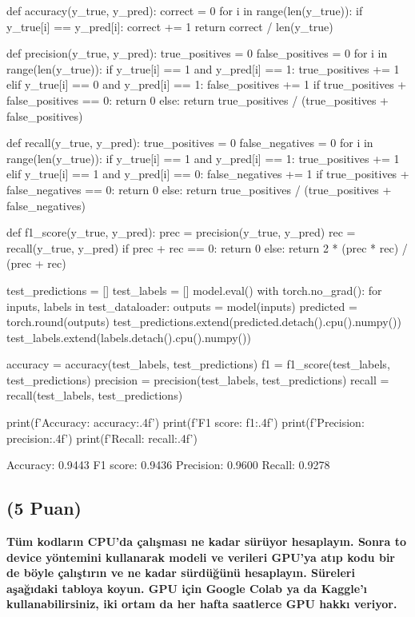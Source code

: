 \documentclass[11pt]{article}
\begin{document}
\begin{python}
def accuracy(y_true, y_pred):
    correct = 0
    for i in range(len(y_true)):
        if y_true[i] == y_pred[i]:
            correct += 1
    return correct / len(y_true)

def precision(y_true, y_pred):
    true_positives = 0
    false_positives = 0
    for i in range(len(y_true)):
        if y_true[i] == 1 and y_pred[i] == 1:
            true_positives += 1
        elif y_true[i] == 0 and y_pred[i] == 1:
            false_positives += 1
    if true_positives + false_positives == 0:
        return 0
    else:
        return true_positives / (true_positives + false_positives)

def recall(y_true, y_pred):
    true_positives = 0
    false_negatives = 0
    for i in range(len(y_true)):
        if y_true[i] == 1 and y_pred[i] == 1:
            true_positives += 1
        elif y_true[i] == 1 and y_pred[i] == 0:
            false_negatives += 1
    if true_positives + false_negatives == 0:
        return 0
    else:
        return true_positives / (true_positives + false_negatives)

def f1_score(y_true, y_pred):
    prec = precision(y_true, y_pred)
    rec = recall(y_true, y_pred)
    if prec + rec == 0:
        return 0
    else:
        return 2 * (prec * rec) / (prec + rec)

test_predictions = []
test_labels = []
model.eval()
with torch.no_grad():
    for inputs, labels in test_dataloader:
        outputs = model(inputs)
        predicted = torch.round(outputs)
        test_predictions.extend(predicted.detach().cpu().numpy())
        test_labels.extend(labels.detach().cpu().numpy())

accuracy = accuracy(test_labels, test_predictions)
f1 = f1_score(test_labels, test_predictions)
precision = precision(test_labels, test_predictions)
recall = recall(test_labels, test_predictions)

print(f'Accuracy: {accuracy:.4f}')
print(f'F1 score: {f1:.4f}')
print(f'Precision: {precision:.4f}')
print(f'Recall: {recall:.4f}')

\end{python}

Accuracy: 0.9443
F1 score: 0.9436
Precision: 0.9600
Recall: 0.9278

\subsection{(5 Puan)} \textbf{Tüm kodların CPU'da çalışması ne kadar sürüyor hesaplayın. Sonra to device yöntemini kullanarak modeli ve verileri GPU'ya atıp kodu bir de böyle çalıştırın ve ne kadar sürdüğünü hesaplayın. Süreleri aşağıdaki tabloya koyun. GPU için Google Colab ya da Kaggle'ı kullanabilirsiniz, iki ortam da her hafta saatlerce GPU hakkı veriyor.}
\end{document}
